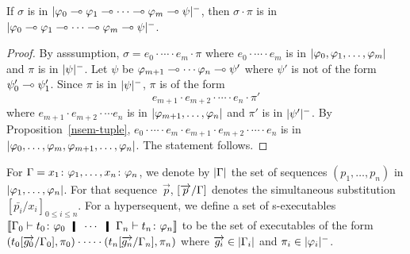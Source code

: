  \begin{proposition}
  \label{nsem-imp}
  If $\sigma$ is in
  $|{\varphi_0\multimap\varphi_1\multimap\cdots\multimap\varphi_m\multimap\psi}|^-$, then
  $\sigma\cdot\pi$ is in
  $|{\varphi_0\multimap\varphi_1\multimap\cdots\multimap\varphi_m\multimap\psi}|^-$.
 \end{proposition}
  \begin{proof}
   By asssumption, $\sigma = e_0\cdot\cdots\cdot e_m\cdot \pi$
   where $e_0\cdot\cdots\cdot e_m$ is in
   $|{\varphi_0,\varphi_1,\ldots,\varphi_m}|$ and $\pi$ is in $|{\psi}|^-$.
   Let $\psi$ be $\varphi_{m+1}\multimap\cdots\varphi_n\multimap\psi'$ where $\psi'$
   is not of the form $\psi'_0\multimap\psi'_1$.
   Since $\pi$ is in $|{\psi}|^-$,
   $\pi$ is of the form
   \[
    e_{m+1}\cdot e_{m+2}\cdot \cdots \cdot e_n\cdot \pi'
   \]
   where $e_{m+1}\cdot e_{m+2}\cdot \cdots e_n$ is in
   $|{{\varphi_{m+1}}, \ldots, {\varphi_n}}|$
   and $\pi'$ is in $|{\psi'}|^-$.
   By Proposition~\ref{nsem-tuple},
   $ e_0\cdot\cdots\cdot e_m\cdot e_{m+1}\cdot e_{m+2}\cdot \cdots \cdot e_n $ is in
   $|{{\varphi_0},\ldots,{\varphi_m},{\varphi_{m+1}}, \ldots,
   {\varphi_n}}|$.  The statement follows.
  \end{proof}

For $\Gamma = {x_1} \colon{\varphi_1},\ldots,{x_n} \colon{\varphi_n}$,
we denote by $|{\Gamma}|$ the set of sequences $(p_1,\dots,p_n)$
 in $|{\varphi_1,\ldots,\varphi_n}|$.
For that sequence~$\vec p$, $[\overrightarrow{p}/\Gamma]$ denotes the simultaneous substitution
$[\bar{p_i}/x_i]_{0\le i \le n}$.
For a hypersequent, we
define a set of s-executables
$
\semo{\G_0\tr\tj{t_0}{\phi_0}\hmid\cdots\hmid\G_n\tr\tj{t_n}{\phi_n}}
$
to be the set of executables of the form
$
\left(t_0[\overrightarrow{g_0}/\Gamma_0],\pi_0\right)\cdot\cdots\cdot
\left(t_n[\overrightarrow{g_n}/\Gamma_n],\pi_n\right)
$
 where
$\overrightarrow{g_i} \in |{\Gamma_i}|$ and $\pi_i\in |{\varphi_i}|^-$.

